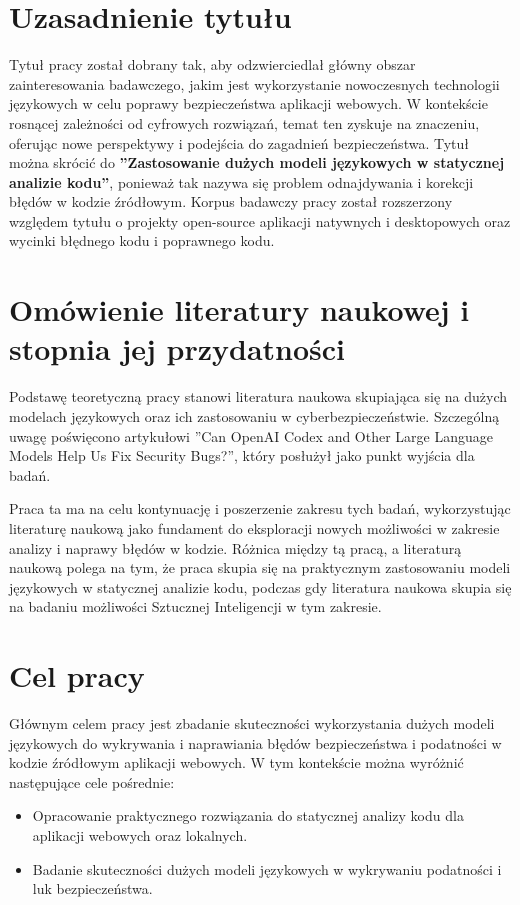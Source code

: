 \section*{Uzasadnienie tytułu}
Tytuł pracy został dobrany tak, aby odzwierciedlał główny obszar zainteresowania badawczego, jakim jest wykorzystanie nowoczesnych technologii językowych w celu poprawy bezpieczeństwa aplikacji webowych. 
W kontekście rosnącej zależności od cyfrowych rozwiązań, temat ten zyskuje na znaczeniu, oferując nowe perspektywy i podejścia do zagadnień bezpieczeństwa.
Tytuł można skrócić do \textbf{''Zastosowanie dużych modeli językowych w statycznej analizie kodu''}, ponieważ tak nazywa się problem odnajdywania i korekcji błędów w kodzie źródłowym. 
Korpus badawczy pracy został rozszerzony względem tytułu o projekty open-source aplikacji natywnych i desktopowych oraz wycinki błędnego kodu i poprawnego kodu. 

\section*{Omówienie literatury naukowej i stopnia jej przydatności}
Podstawę teoretyczną pracy stanowi literatura naukowa skupiająca się na dużych modelach językowych oraz ich zastosowaniu w cyberbezpieczeństwie. Szczególną uwagę poświęcono artykułowi ''Can OpenAI Codex and Other Large Language Models Help Us Fix Security Bugs?'', który posłużył jako punkt wyjścia dla badań. 

Praca ta ma na celu kontynuację i poszerzenie zakresu tych badań, wykorzystując literaturę naukową jako fundament do eksploracji nowych możliwości w zakresie analizy i naprawy błędów w kodzie.
Różnica między tą pracą, a literaturą naukową polega na tym, że praca skupia się na praktycznym zastosowaniu modeli językowych w statycznej analizie kodu, podczas gdy literatura naukowa skupia się na badaniu możliwości Sztucznej Inteligencji w tym zakresie.

\section*{Cel pracy}
Głównym celem pracy jest zbadanie skuteczności wykorzystania dużych modeli językowych do wykrywania i naprawiania błędów bezpieczeństwa i podatności w kodzie źródłowym aplikacji webowych. 
W tym kontekście można wyróżnić następujące cele pośrednie:
\begin{itemize}
    \item Opracowanie praktycznego rozwiązania do statycznej analizy kodu dla aplikacji webowych oraz lokalnych.
    \item Badanie skuteczności dużych modeli językowych w wykrywaniu podatności i luk bezpieczeństwa.
\end{itemize}
